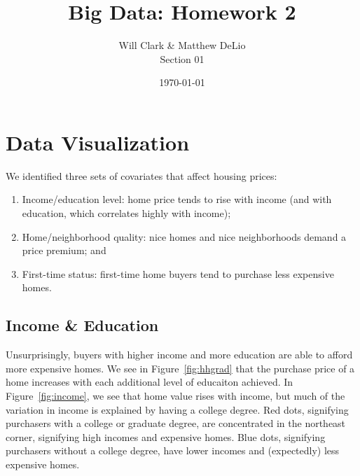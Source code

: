 \documentclass[11pt, fleqn]{article}
\begin{document}
\title{Big Data: Homework 2}
\author{Will Clark \& Matthew DeLio \\ Section 01}
\date{\today}
\maketitle

\section{Data Visualization}

We identified three sets of covariates that affect housing prices:
\begin{enumerate}
\item Income/education level: home price tends to rise with income (and with education, which correlates highly with income);
\item Home/neighborhood quality: nice homes and nice neighborhoods demand a price premium; and
\item First-time status: first-time home buyers tend to purchase less expensive homes.
\end{enumerate}

\subsection{Income \& Education}

Unsurprisingly, buyers with higher income and more education are able to afford more expensive homes. We see in Figure~\vref{fig:hhgrad} that the purchase price of a home increases with each additional level of educaiton achieved. In Figure~\vref{fig:income}, we see that home value rises with income, but much of the variation in income is explained by having a college degree. Red dots, signifying purchasers with a college or graduate degree, are concentrated in the northeast corner, signifying high incomes and expensive homes. Blue dots, signifying purchasers without a college degree, have lower incomes and (expectedly) less expensive homes.
\end{document}
